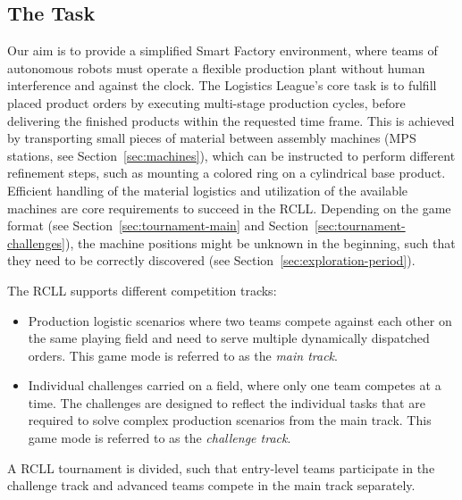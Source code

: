 \documentclass[12pt,twoside]{article}
\newcommand{\refsec}[1]{Section~\ref{#1}}
\begin{document}
\subsection{The Task}
\label{sec:task}
 Our aim is to provide a simplified Smart Factory environment, where
 teams of autonomous robots must operate a flexible production plant without
 human interference and against the clock.
 The Logistics League's core task is to fulfill placed product orders by
 executing multi-stage production cycles, before delivering the finished
 products within the requested time frame.
 This is achieved by transporting small pieces of material between assembly
 machines (\ac{MPS} stations, see \refsec{sec:machines}),
 which can be instructed to perform different refinement steps,
 such as mounting a colored ring on a cylindrical base product.
 Efficient handling of the material logistics and utilization of the available
 machines are core requirements to succeed in the \ac{RCLL}.
Depending on the game format
(see \refsec{sec:tournament-main} and \refsec{sec:tournament-challenges}),
the machine positions might be unknown in the beginning, such that they need
to be correctly discovered (see \refsec{sec:exploration-period}).

The RCLL supports different competition tracks:
\begin{itemize}\itemsep0em
  \item Production logistic scenarios where two teams compete against
    each other on the same playing field and need to serve multiple dynamically
    dispatched orders. This game mode is referred to as the \emph{main track}.
  \item Individual challenges carried on a field, where only one team competes
   at a time.
   The challenges are designed to reflect the individual tasks that
   are required to solve complex production scenarios from the main track.
   This game mode is referred to as the \emph{challenge track}.
\end{itemize}
A \ac{RCLL} tournament is divided, such that entry-level teams participate in
the challenge track and advanced teams compete in the main track separately.
\end{document}
